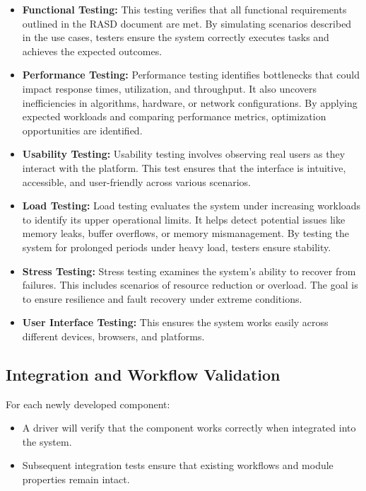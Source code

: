 \begin{itemize}
    \item \textbf{Functional Testing:}  
    This testing verifies that all functional requirements outlined in the RASD document are met. By simulating scenarios described in the use cases, testers ensure the system correctly executes tasks and achieves the expected outcomes.

    \item \textbf{Performance Testing:}  
    Performance testing identifies bottlenecks that could impact response times, utilization, and throughput. It also uncovers inefficiencies in algorithms, hardware, or network configurations. By applying expected workloads and comparing performance metrics, optimization opportunities are identified.

    \item \textbf{Usability Testing:}  
    Usability testing involves observing real users as they interact with the platform. This test ensures that the interface is intuitive, accessible, and user-friendly across various scenarios.

    \item \textbf{Load Testing:}  
    Load testing evaluates the system under increasing workloads to identify its upper operational limits. It helps detect potential issues like memory leaks, buffer overflows, or memory mismanagement. By testing the system for prolonged periods under heavy load, testers ensure stability.

    \item \textbf{Stress Testing:}  
    Stress testing examines the system’s ability to recover from failures. This includes scenarios of resource reduction or overload. The goal is to ensure resilience and fault recovery under extreme conditions.

    \item \textbf{User Interface Testing:}  
    This ensures the system works easily across different devices, browsers, and platforms.
\end{itemize}

\subsection*{Integration and Workflow Validation}
For each newly developed component:

\begin{itemize}
    \item A driver will verify that the component works correctly when integrated into the system.
    \item Subsequent integration tests ensure that existing workflows and module properties remain intact.
\end{itemize}

